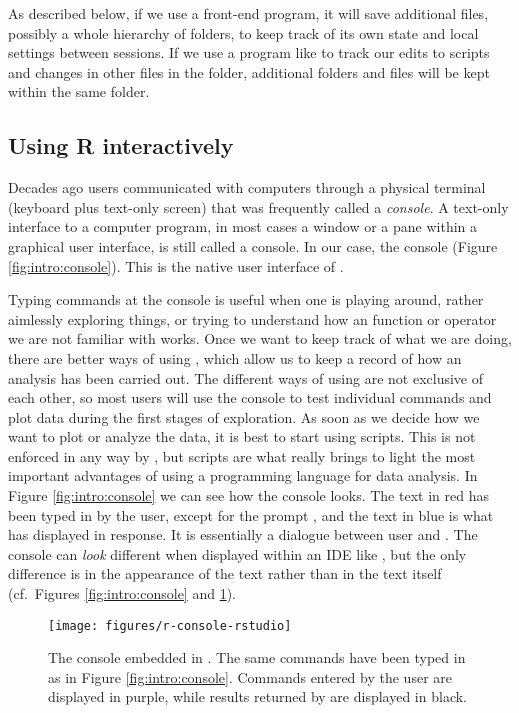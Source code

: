 \documentclass[krantz2]{krantz}\usepackage{knitr}
\begin{document}
As described below, if we use a front-end program, it will save additional files, possibly a whole hierarchy of folders, to keep track of its own state and local settings between sessions. If we use a program like \git to track our edits to \Rlang scripts and changes in other files in the folder, additional folders and files will be kept within the same folder.

\subsection{Using R interactively}

Decades ago users communicated with computers through a physical terminal (keyboard plus text-only screen) that was frequently called a \emph{console}. A text-only interface to a computer program, in most cases a window or a pane within a graphical user interface, is still called a console. In our case, the \Rpgrm console (Figure \ref{fig:intro:console}). This is the native user interface of \Rpgrm.

Typing commands at the \Rpgrm console is useful when one is playing around, rather aimlessly exploring things, or trying to understand how an \Rpgrm function or operator we are not familiar with works. Once we want to keep track of what we are doing, there are better ways of using \Rpgrm, which allow us to keep a record of how an analysis has been carried out. The different ways of using \Rpgrm are not exclusive of each other, so most users will use the \Rpgrm console to test individual commands and plot data during the first stages of exploration. As soon as we decide how we want to plot or analyze the data, it is best to start using scripts. This is not enforced in any way by \Rpgrm, but scripts are what really brings to light the most important advantages of using a programming language for data analysis. In Figure \ref{fig:intro:console} we can see how the \Rpgrm console looks. The text in red has been typed in by the user, except for the prompt \code{\textcolor{red}{$>$}}, and the text in blue is what \Rpgrm has displayed in response. It is essentially a dialogue between user and \Rpgrm. The console can \emph{look} different when displayed within an IDE like \RStudio, but the only difference is in the appearance of the text rather than in the text itself (cf.\ Figures \ref{fig:intro:console} and \ref{fig:intro:console:rstudio}).

\begin{figure}
  \centering
  \texttt{[image: figures/r-console-rstudio]}
  \caption[The R console]{The \Rpgrm console embedded in \RStudio. The same commands have been typed in as in Figure \ref{fig:intro:console}. Commands entered by the user are displayed in purple, while results returned by \Rpgrm are displayed in black.}\label{fig:intro:console:rstudio}
\end{figure}
\end{document}
